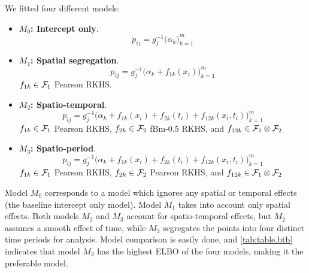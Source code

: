 \documentclass[showframe,11pt]{report}\usepackage[]{graphicx}\usepackage{xcolor}
\begin{document}
We fitted four different models:
\begin{itemize}
  \item \textbf{\boldmath$M_0$: Intercept only}.
  \[
    p_{ij} = g^{-1}_j\big( \alpha_k \big)_{k=1}^m
  \]
  \item \textbf{\boldmath$M_1$: Spatial segregation}.
  \[
    p_{ij} = g^{-1}_j\big(\alpha_k + f_{1k}(x_i) \big)_{k=1}^m
  \]
  $f_{1k} \in {\mathcal F}_1$ Pearson RKHS.
  \item \textbf{\boldmath$M_2$: Spatio-temporal}.
  \[
    p_{ij} = g^{-1}_j\big(\alpha_k + f_{1k}(x_i) + f_{2k}(t_i) + f_{12k}(x_i,t_i) \big)_{k=1}^m
  \]
  $f_{1k} \in {\mathcal F}_1$ Pearson RKHS, $f_{2k} \in {\mathcal F}_2$ fBm-0.5 RKHS, and $f_{12k} \in {\mathcal F}_1\otimes{\mathcal F}_2$
  \item \textbf{\boldmath$M_3$: Spatio-period}.
  \[
    p_{ij} = g^{-1}_j\big(\alpha_k + f_{1k}(x_i) + f_{2k}(t_i) + f_{12k}(x_i,t_i) \big)_{k=1}^m
  \]
  $f_{1k} \in {\mathcal F}_1$ Pearson RKHS, $f_{2k} \in {\mathcal F}_2$ Pearson RKHS, and $f_{12k} \in {\mathcal F}_1\otimes{\mathcal F}_2$
\end{itemize}
Model $M_0$ corresponds to a model which ignores any spatial or temporal effects (the baseline intercept only model).
Model $M_1$ takes into account only spatial effects.
Both models $M_2$ and $M_3$ account for spatio-temporal effects, but $M_2$ assumes a smooth effect of time, while $M_3$ segregates the points into four distinct time periods for analysis.
Model comparison is easily done, and \cref{tab:table.btb} indicates that model $M_2$ has the highest ELBO of the four models, making it the preferable model.

\end{document}
